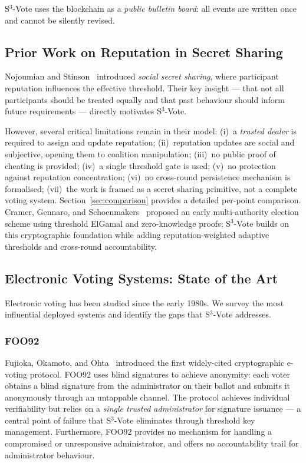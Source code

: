 \documentclass[12pt,a4paper]{article}
\theoremstyle{definition}
\theoremstyle{remark}
\begin{document}
S$^3$-Vote uses the blockchain as a \emph{public bulletin board}: all
events are written once and cannot be silently revised.

\subsection{Prior Work on Reputation in Secret Sharing}

Nojoumian and Stinson~\cite{nojoumian2012,nojoumian2018} introduced
\emph{social secret sharing}, where participant reputation influences the
effective threshold. Their key insight — that not all participants should
be treated equally and that past behaviour should inform future requirements
— directly motivates S$^3$-Vote.

However, several critical limitations remain in their model:
(i)~a \emph{trusted dealer} is required to assign and update reputation;
(ii)~reputation updates are social and subjective, opening them to
coalition manipulation;
(iii)~no public proof of cheating is provided;
(iv)~a single threshold gate is used;
(v)~no protection against reputation concentration;
(vi)~no cross-round persistence mechanism is formalised;
(vii)~the work is framed as a secret sharing primitive, not a complete
voting system.
Section~\ref{sec:comparison} provides a detailed per-point comparison.
Cramer, Gennaro, and Schoenmakers~\cite{cramer1997} proposed an early
multi-authority election scheme using threshold ElGamal and zero-knowledge
proofs; S$^3$-Vote builds on this cryptographic foundation while adding
reputation-weighted adaptive thresholds and cross-round accountability.

\subsection{Electronic Voting Systems: State of the Art}
\label{sec:evoting}

Electronic voting has been studied since the early 1980s.
We survey the most influential deployed systems and identify the gaps
that S$^3$-Vote addresses.

\subsubsection*{FOO92}
Fujioka, Okamoto, and Ohta~\cite{foo1992} introduced the first
widely-cited cryptographic e-voting protocol.
FOO92 uses blind signatures to achieve anonymity: each voter obtains a
blind signature from the administrator on their ballot and submits it
anonymously through an untappable channel.
The protocol achieves individual verifiability but relies on a
\emph{single trusted administrator} for signature issuance — a central
point of failure that S$^3$-Vote eliminates through threshold key management.
Furthermore, FOO92 provides no mechanism for handling a compromised or
unresponsive administrator, and offers no accountability trail for
administrator behaviour.
\end{document}
